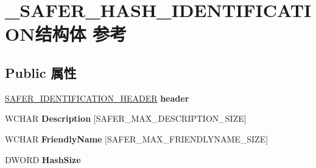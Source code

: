 \hypertarget{struct___s_a_f_e_r___h_a_s_h___i_d_e_n_t_i_f_i_c_a_t_i_o_n}{}\section{\+\_\+\+S\+A\+F\+E\+R\+\_\+\+H\+A\+S\+H\+\_\+\+I\+D\+E\+N\+T\+I\+F\+I\+C\+A\+T\+I\+O\+N结构体 参考}
\label{struct___s_a_f_e_r___h_a_s_h___i_d_e_n_t_i_f_i_c_a_t_i_o_n}
\subsection*{Public 属性}
\begin{DoxyCompactItemize}
\item 
\mbox{\label{struct___s_a_f_e_r___h_a_s_h___i_d_e_n_t_i_f_i_c_a_t_i_o_n_a027908039df8b40a793f7e29bd50e438}} 
\hyperlink{struct___s_a_f_e_r___i_d_e_n_t_i_f_i_c_a_t_i_o_n___h_e_a_d_e_r}{S\+A\+F\+E\+R\+\_\+\+I\+D\+E\+N\+T\+I\+F\+I\+C\+A\+T\+I\+O\+N\+\_\+\+H\+E\+A\+D\+ER} {\bfseries header}
\item 
\mbox{\label{struct___s_a_f_e_r___h_a_s_h___i_d_e_n_t_i_f_i_c_a_t_i_o_n_a34ad9dad145c58fdea8eee59efab1d11}} 
W\+C\+H\+AR {\bfseries Description} \mbox{[}S\+A\+F\+E\+R\+\_\+\+M\+A\+X\+\_\+\+D\+E\+S\+C\+R\+I\+P\+T\+I\+O\+N\+\_\+\+S\+I\+ZE\mbox{]}
\item 
\mbox{\label{struct___s_a_f_e_r___h_a_s_h___i_d_e_n_t_i_f_i_c_a_t_i_o_n_a7d15069385bbe897cdf7667c35601c2d}} 
W\+C\+H\+AR {\bfseries Friendly\+Name} \mbox{[}S\+A\+F\+E\+R\+\_\+\+M\+A\+X\+\_\+\+F\+R\+I\+E\+N\+D\+L\+Y\+N\+A\+M\+E\+\_\+\+S\+I\+ZE\mbox{]}
\item 
\mbox{\label{struct___s_a_f_e_r___h_a_s_h___i_d_e_n_t_i_f_i_c_a_t_i_o_n_a966a00dd1ff95f36828b3f7ac7d0f993}} 
D\+W\+O\+RD {\bfseries Hash\+Size}
\item 
\mbox{\label{struct___s_a_f_e_r___h_a_s_h___i_d_e_n_t_i_f_i_c_a_t_i_o_n_abcaa885a5d149086a5d9f623e852a7a1}} 

\end{DoxyCompactItemize}
